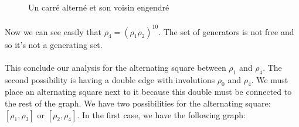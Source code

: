 \begin{figure}[H]
  \begin{center}
    \caption{Un carré alterné et son voisin engendré}
  \end{center}
\end{figure}

\paragraph{}
Now we can see easily that $\rho_4 = (\rho_1 \rho_2)^{10}$. The set of generators is not free and so it's not a generating set.

\paragraph{}
This conclude our analysis for the alternating square between $\rho_1$ and $\rho_4$. The second possibility is having a double edge with involutions $\rho_0$ and $\rho_4$. We must place an alternating square next to it because this double must be connected to the rest of the graph. We have two possibilities for the alternating square: $[\rho_1, \rho_3]$ or $[\rho_2, \rho_4]$. In the first case, we have the following graph:

